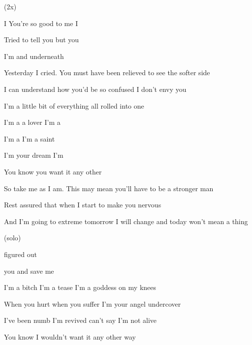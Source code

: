 
(2x)

   

\zs
I  You're so good to me I 

Tried to tell you but you 

I'm and  underneath 
 \ks

\zs
Yesterday I cried. You must have been relieved to see the softer side

I can understand how you'd be so confused I don't envy you

I'm a little bit of everything all rolled into one
\ks

\zr
I'm a  a lover I'm a 

I'm a  I'm a saint 

I'm your  dream I'm 

You know you  want it any other 
\kr

\zs
So take me as I am. This may mean you'll have to be a stronger man

Rest assured that when I start to make you nervous

And I'm going to extreme tomorrow I will change and today won't mean a thing
\ks

\zr

\kr

\zr (solo) \kr

 figured out  

 you  and  save me

\zr
\kr

\zr
I'm a bitch I'm a tease I'm a goddess on my knees

When you hurt when you suffer I'm your angel undercover

I've been numb I'm revived can't say I'm not alive

You know I wouldn't want it any other way
\kr

        

      


\kp